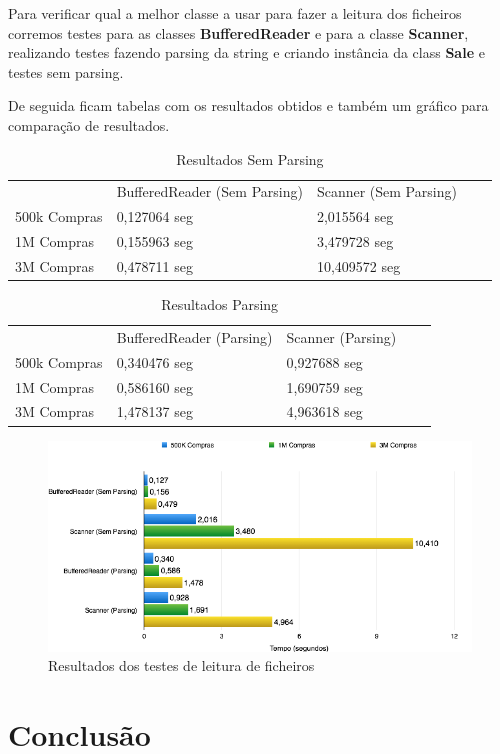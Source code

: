 \documentclass[10pt] {article}
\begin{document}
\par Para verificar qual a melhor classe a usar para fazer a leitura dos ficheiros corremos testes para as classes 
\textbf{BufferedReader} e para a classe \textbf{Scanner}, realizando testes fazendo parsing da string e criando instância 
da class \textbf{Sale} e testes sem parsing.
\par De seguida ficam tabelas com os resultados obtidos e também um gráfico para comparação de resultados.

\begin{table}[h]
\centering
\caption{Resultados Sem Parsing}
\label{my-label}
\begin{tabular}{l|l|l|ll}
\cline{2-3}
                                   & BufferedReader (Sem Parsing) & Scanner (Sem Parsing) &  &  \\ \cline{1-3}
\multicolumn{1}{|l|}{500k Compras} & 0,127064 seg                 & 2,015564 seg          &  &  \\ \cline{1-3}
\multicolumn{1}{|l|}{1M Compras}   & 0,155963 seg                 & 3,479728 seg          &  &  \\ \cline{1-3}
\multicolumn{1}{|l|}{3M Compras}   & 0,478711 seg                 & 10,409572 seg         &  &  \\ \cline{1-3}
\end{tabular}
\end{table}

\begin{table}[h]
\centering
\caption{Resultados Parsing}
\label{my-label}
\begin{tabular}{l|l|l|ll}
\cline{2-3}
                                   & BufferedReader (Parsing) & Scanner (Parsing) &  &  \\ \cline{1-3}
\multicolumn{1}{|l|}{500k Compras} & 0,340476 seg             & 0,927688 seg      &  &  \\ \cline{1-3}
\multicolumn{1}{|l|}{1M Compras}   & 0,586160 seg             & 1,690759 seg      &  &  \\ \cline{1-3}
\multicolumn{1}{|l|}{3M Compras}   & 1,478137 seg             & 4,963618 seg      &  &  \\ \cline{1-3}
\end{tabular}
\end{table}

\begin{figure}[ht!]
\centering
\includegraphics[width=150mm]{filegraph.png}
\caption{Resultados dos testes de leitura de ficheiros}
\label{fig:sales}
\end{figure}

\newpage
\section{Conclusão}
\end{document}
